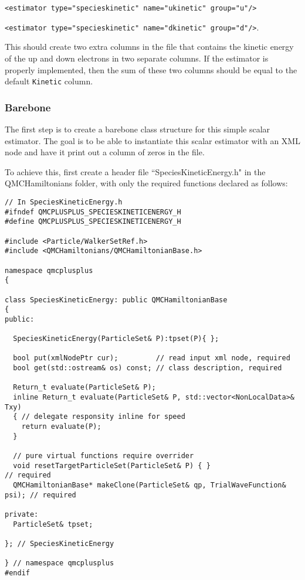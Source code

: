 \verb|<estimator type="specieskinetic" name="ukinetic" group="u"/>|

\verb|<estimator type="specieskinetic" name="dkinetic" group="d"/>|\:.

This should create two extra columns in the  file that contains the kinetic energy of the up and down electrons in two separate columns. If the estimator is properly implemented, then the sum of these two columns should be equal to the default \verb|Kinetic| column.

\subsubsection{Barebone}

The first step is to create a barebone class structure for this simple scalar estimator. The goal is to be able to instantiate this scalar estimator with an XML node and have it print out a column of zeros in the  file. 

To achieve this, first create a header file ``SpeciesKineticEnergy.h" in the QMCHamiltonians folder, with only the required functions declared as follows: 

\begin{lstlisting}[style=C++]
// In SpeciesKineticEnergy.h
#ifndef QMCPLUSPLUS_SPECIESKINETICENERGY_H
#define QMCPLUSPLUS_SPECIESKINETICENERGY_H

#include <Particle/WalkerSetRef.h>
#include <QMCHamiltonians/QMCHamiltonianBase.h>

namespace qmcplusplus
{

class SpeciesKineticEnergy: public QMCHamiltonianBase
{
public:
  
  SpeciesKineticEnergy(ParticleSet& P):tpset(P){ };
  
  bool put(xmlNodePtr cur);         // read input xml node, required
  bool get(std::ostream& os) const; // class description, required
  
  Return_t evaluate(ParticleSet& P);
  inline Return_t evaluate(ParticleSet& P, std::vector<NonLocalData>& Txy)
  { // delegate responsity inline for speed
    return evaluate(P);
  } 
  
  // pure virtual functions require overrider
  void resetTargetParticleSet(ParticleSet& P) { }                         // required
  QMCHamiltonianBase* makeClone(ParticleSet& qp, TrialWaveFunction& psi); // required

private:
  ParticleSet& tpset;

}; // SpeciesKineticEnergy

} // namespace qmcplusplus
#endif
\end{lstlisting}

